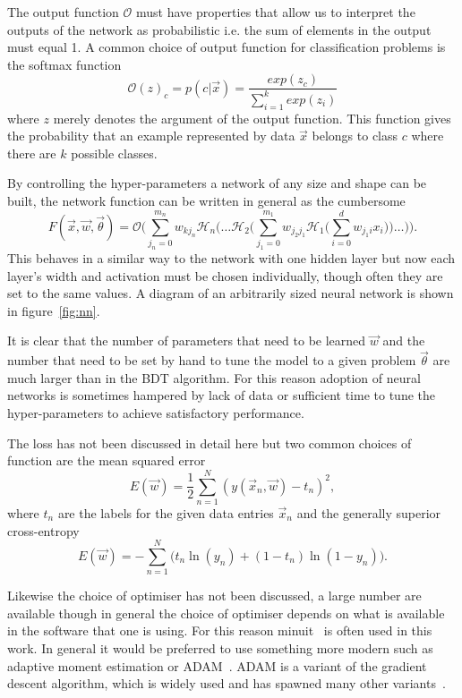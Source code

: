 The output function $\mathcal{O}$ must have properties that allow us to
interpret the outputs of the network as probabilistic i.e. the sum of elements
in the output must equal 1. A common choice of output function for
classification problems is the softmax function
\begin{equation}
  \mathcal{O}(z)_c = p(c|\vec{x}) = \frac{exp(z_c)}{\sum_{i=1}^kexp(z_i)}
  \label{eq:softmax}
\end{equation}
where $z$ merely denotes the argument of the output function. This function
gives the probability that an example represented by data $\vec{x}$ belongs to
class $c$ where there are $k$ possible classes.

By controlling the hyper-parameters a network of any size and shape can be
built, the network function can be written in general as the cumbersome
\begin{equation}
  F(\vec{x}, \vec{w}, \vec{\theta}) = \mathcal{O} \Bigg( \sum_{j_{n}=0}^{m_{n}} w_{kj_{n}}
  \mathcal{H}_{n} \Bigg( \dots \mathcal{H}_2  \Bigg( \sum_{j_{1}=0}^{m_{1}} w_{j_{2}j_{1}} 
  \mathcal{H}_{1} \Bigg( \sum_{i=0}^{d} w_{j_{1}i} x_{i} \Bigg) \Bigg) \dots \Bigg) \Bigg).
  \label{eq:fullnn}
\end{equation}
This behaves in a similar way to the network with one hidden layer but now each
layer's width and activation must be chosen individually, though often they are
set to the same values. A diagram of an arbitrarily sized neural network is
shown in figure~\ref{fig:nn}.

It is clear that the number of parameters that need to be learned $\vec{w}$ and
the number that need to be set by hand to tune the model to a given problem
$\vec{\theta}$ are much larger than in the BDT algorithm. For this reason
adoption of neural networks is sometimes hampered by lack of data or sufficient
time to tune the hyper-parameters to achieve satisfactory performance.

The loss has not been discussed in detail here but two common choices of
function are the mean squared error
\begin{equation}
E(\vec{w}) = \frac{1}{2}\sum_{n=1}^{N}(y(\vec{x}_n, \vec{w}) - t_n)^2,
\label{eq:MSE}
\end{equation}
where $t_n$ are the labels for the given data entries $\vec{x}_n$ and the
generally superior cross-entropy~\cite{XEntropySimard}
\begin{equation}
E(\vec{w}) = - \sum_{n=1}^{N} \Bigg (t_n \ln (y_n) + (1-t_n) \ln (1-y_n) \Bigg).
\label{eq:xentropy}
\end{equation}

Likewise the choice of optimiser has not been discussed, a large number are
available though in general the choice of optimiser depends on what is available
in the software that one is using. For this reason minuit~\cite{minuit} is often
used in this work. In general it would be preferred to use something more
modern such as adaptive moment estimation or ADAM~\cite{ADAMOpt}. ADAM is a
variant of the gradient descent algorithm, which is widely used and has spawned
many other variants~\cite{GDOverview}.
